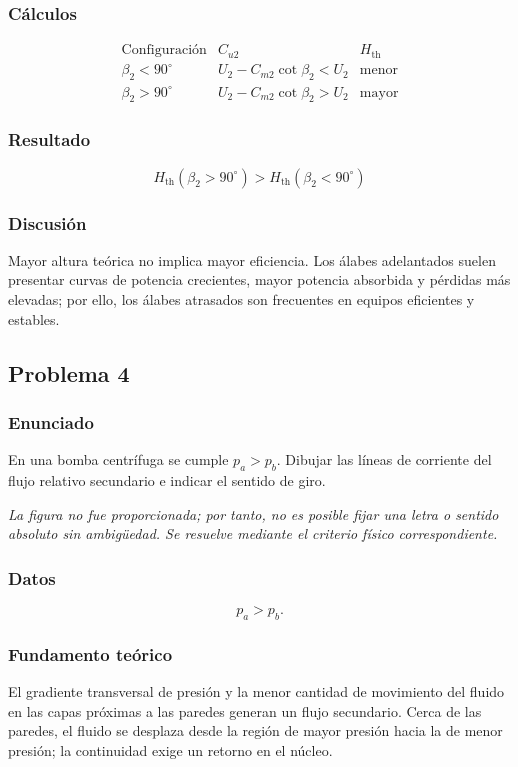 \documentclass[12pt]{article}
\newcommand{\figuraFaltante}{\emph{La figura no fue proporcionada; por tanto, no es posible fijar una letra o sentido absoluto sin ambigüedad. Se resuelve mediante el criterio físico correspondiente.}}
\newcommand{\resultado}[1]{\[
  \boxed{\displaystyle #1}
\]}
\begin{document}
\subsubsection*{Cálculos}
\[
\begin{array}{c|c|c}
\text{Configuración} & C_{u2} & H_{\mathrm{th}}\\ \hline
\beta_2<90^\circ & U_2-C_{m2}\cot\beta_2<U_2 & \text{menor}\\
\beta_2>90^\circ & U_2-C_{m2}\cot\beta_2>U_2 & \text{mayor}
\end{array}
\]

\subsubsection*{Resultado}
\resultado{H_{\mathrm{th}}(\beta_2>90^\circ)>
H_{\mathrm{th}}(\beta_2<90^\circ)}

\subsubsection*{Discusión}
Mayor altura teórica no implica mayor eficiencia. Los álabes adelantados suelen presentar
curvas de potencia crecientes, mayor potencia absorbida y pérdidas más elevadas; por ello,
los álabes atrasados son frecuentes en equipos eficientes y estables.

\subsection{Problema 4}

\subsubsection*{Enunciado}
En una bomba centrífuga se cumple $p_a>p_b$. Dibujar las líneas de corriente del flujo
relativo secundario e indicar el sentido de giro.

\figuraFaltante

\subsubsection*{Datos}
\[
p_a>p_b.
\]

\subsubsection*{Fundamento teórico}
El gradiente transversal de presión y la menor cantidad de movimiento del fluido en las
capas próximas a las paredes generan un flujo secundario. Cerca de las paredes, el fluido
se desplaza desde la región de mayor presión hacia la de menor presión; la continuidad exige
un retorno en el núcleo.
\end{document}
